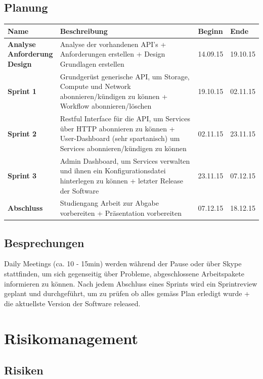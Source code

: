 \subsection{Planung}
\begin{tabularx}{\textwidth}{l X l l}
\textbf{Name} & \textbf{Beschreibung} & \textbf{Beginn} &  \textbf{Ende} \\
\hline
\pbox{3cm}{
\textbf{Analyse}
\\
\textbf{Anforderung}
\\
\textbf{Design} 
}& Analyse der vorhandenen API's + Anforderungen 
erstellen + Design Grundlagen erstellen & 14.09.15 & 19.10.15\\
\hline
\textbf{Sprint 1} & Grundgerüst generische API, um Storage, Compute und Network 
abonnieren/kündigen zu können
+ Workflow abonnieren/löschen  & 19.10.15 & 02.11.15 \\
\hline
\textbf{Sprint 2} & Restful Interface für die API, um Services über HTTP 
abonnieren zu können + User-Dashboard (sehr spartanisch)  um Services 
abonnieren/kündigen zu können
& 02.11.15 & 23.11.15 \\
\hline
\textbf{Sprint 3} & Admin Dashboard, um Services verwalten 
und ihnen ein Konfigurationsdatei hinterlegen zu können + letzter Release der Software & 23.11.15 & 07.12.15 \\
\hline
\textbf{Abschluss} & Studiengang Arbeit zur Abgabe vorbereiten + Präsentation 
vorbereiten & 07.12.15 & 18.12.15\\
\end{tabularx}

\subsection{Besprechungen}
Daily Meetings (ca. 10 - 15min) werden während der Pause oder über Skype stattfinden, um sich 
gegenseitig über Probleme, abgeschlossene Arbeitspakete informieren zu können.
Nach jedem Abschluss eines Sprints wird ein Sprintreview geplant und durchgeführt, um zu prüfen 
ob alles gemäss Plan erledigt wurde + die aktuellste Version der Software 
released.
\section{Risikomanagement}
\subsection{Risiken}

